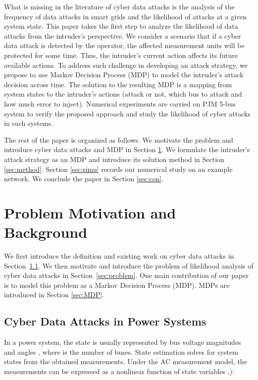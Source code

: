 \documentclass[conference,letterpaper,10pt]{IEEEtran}
\begin{document}
What is missing in the literature of cyber data attacks is the analysis of the frequency of data attacks in smart grids and the likelihood of attacks at a given system state. 
This paper takes the first step to  analyze the likelihood of data attacks from the intruder's perspective. We consider a scenario that  if a cyber data attack is detected by the operator,   the affected measurement units will be protected for some time. Thus, the intruder's current action  affects its future available actions.
To address such challenge in  developing an attack strategy, we propose to use Markov Decision Process (MDP) \cite{MP94} to  model the intruder's attack decision across time. The solution to the resulting MDP
is a mapping from system states to the intruder's actions (attack or not, which bus to attack and how much error to inject). Numerical experiments are carried on PJM 5-bus system to verify the proposed approach and study the likelihood of cyber attacks in such systems. 

The rest of the paper is organized as follows. We motivate the problem and introduce cyber data attacks and MDP in Section \ref{sec:model}. We formulate the intruder's attack strategy as an MDP and introduce its solution method in Section \ref{sec:method}.  Section \ref{sec:simu} records our numerical study on an example network. We conclude the paper in Section \ref{sec:con}. 

\section{Problem Motivation and Background} \label{sec:model}

We first introduce the definition and existing work on cyber data attacks in Section~\ref{sec:cyber}. We then motivate and introduce the problem of likelihood analysis of cyber data attacks in Section~\ref{sec:problem}. One main contribution of our paper is to model this problem as a Markov Decision Process (MDP).  MDPs are introduced in Section \ref{sec:MDP}.
\subsection{Cyber Data Attacks in Power Systems}\label{sec:cyber}
In a power system, the state is usually represented by bus voltage magnitudes  and angles , where  is the number of buses. 
State estimation \cite{AE04} solves for system states from the obtained measurements.
Under the AC measurement model, the measurements  can be expressed as a nonlinear function of state variables ,):
\end{document}
